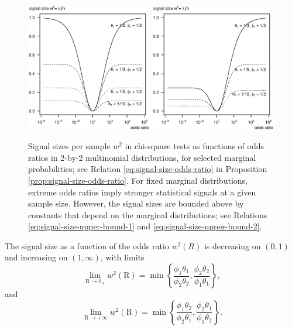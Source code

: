 \begin{figure}
      \centering
      \includegraphics[width=0.49\textwidth]{./singal-vs-odds-p05}
      \includegraphics[width=0.49\textwidth]{./singal-vs-odds-p0333}            
      \caption{Signal sizes per sample $w^2$ in chi-square tests as functions of odds ratios in 2-by-2 multinomial distributions, for selected marginal probabilities; see Relation \eqref{eq:signal-size-odds-ratio} in Proposition \ref{prop:signal-size-odds-ratio}.
      For fixed marginal distributions, extreme odds ratios imply stronger statistical signals at a given sample size.
      However, the signal sizes are bounded above by constants that depend on the marginal distributions; see Relations \eqref{eq:signal-size-upper-bound-1} and \eqref{eq:signal-size-upper-bound-2}.
      } 
      \label{fig:signal-vs-odds}
\end{figure}

\begin{corollary} \label{cor:signal-limits-OR}
The signal size as a function of the odds ratio $w^2(R)$ is decreasing on $(0,1)$ and increasing on $(1,\infty)$, with limits
\begin{equation} \label{eq:signal-size-upper-bound-1}
    \lim_{\text{R}\to0_+} w^2(\text{R}) = \min\left\{\frac{\phi_1\theta_1}{\phi_2\theta_2}, \frac{\phi_2\theta_2}{\phi_1\theta_1}\right\},
\end{equation}
and
\begin{equation} \label{eq:signal-size-upper-bound-2}
    \lim_{\text{R}\to+\infty} w^2(\text{R}) = \min\left\{\frac{\phi_1\theta_2}{\phi_2\theta_1}, \frac{\phi_2\theta_1}{\phi_1\theta_2}\right\}.
\end{equation}
\end{corollary}


